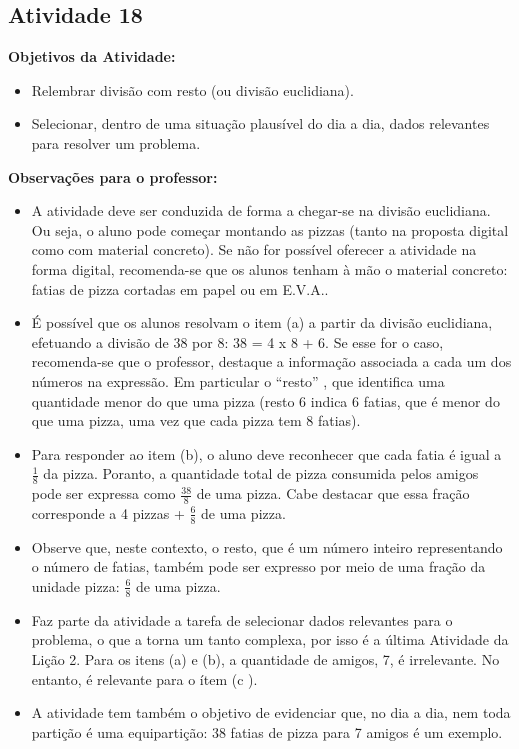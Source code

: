 \documentclass[oneside]{book}
\begin{document}
\begin{multicols}{2}
\subsection{Atividade 18}

{\bf Objetivos da Atividade:}\vspace{.1cm}

\begin{itemize} %
    \item       Relembrar divisão com resto (ou divisão euclidiana).
    \item       Selecionar, dentro de uma situação plausível do dia a dia, dados relevantes para resolver um problema.
\end{itemize} %
\vspace{.1cm}

{\bf Observações para o professor:}\vspace{.1cm}

\begin{itemize} %
    \item       A atividade deve ser conduzida de forma a chegar-se na divisão euclidiana. Ou seja, o aluno pode começar montando as pizzas (tanto na proposta digital como com material concreto). Se não for possível oferecer a atividade na forma digital, recomenda-se que os alunos tenham à mão o material concreto: fatias de pizza cortadas em papel ou em E.V.A..
    \item       É possível que os alunos resolvam o item (a) a partir da divisão euclidiana, efetuando a divisão de 38 por 8: 38 = 4 x 8 + 6. Se esse for o caso, recomenda-se que o professor, destaque a informação associada a cada um dos números na expressão. Em particular o       ``resto''      , que identifica uma quantidade menor do que uma pizza (resto 6 indica 6 fatias, que é menor do que uma pizza, uma vez que cada pizza tem 8 fatias).
    \item       Para responder ao item (b), o aluno deve reconhecer que cada fatia é igual a       $\frac{1}{8}$       da pizza. Poranto, a quantidade total de pizza consumida pelos amigos pode ser expressa como       $\frac{38}{8}$       de uma pizza. Cabe destacar que essa fração corresponde a 4 pizzas +       $\frac{6}{8}$       de uma pizza.
    \item        Observe que, neste contexto, o resto, que é um número inteiro representando o número de fatias, também pode ser expresso por meio de uma fração da unidade pizza:       $\frac{6}{8}$       de uma pizza.
    \item       Faz parte da atividade a tarefa de selecionar dados relevantes para o problema, o que a torna um tanto complexa, por isso é a última Atividade da Lição 2. Para os itens (a) e (b), a quantidade de amigos, 7, é irrelevante. No entanto, é relevante para o ítem (c ).
    \item       A atividade tem também o objetivo de evidenciar que, no dia a dia, nem toda partição é uma equipartição: 38 fatias de pizza para 7 amigos é um exemplo.
\end{itemize} %




\end{multicols}
\end{document}
